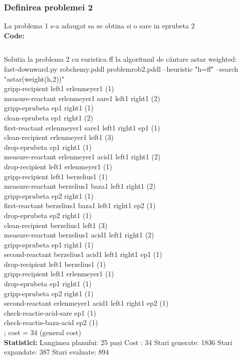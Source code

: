 \subsubsection{Definirea problemei 2}
   La problema 1 s-a adaugat sa se obtina si o sare in eprubeta 2\\\newline
\textbf{Code:}
\inputminted[linenos]{python}{code/ClassicPDDL/problemrob2.pddl}
Solutia la problema 2 cu euristica ff la algoritmul de căutare astar weighted: \\
fast-downward.py robchemy.pddl problemrob2.pddl --heuristic "h=ff" --search "astar(weight(h,2))" \\
gripp-recipient left1 erlenmeyer1 (1)\\
measure-reactant erlenmeyer1 sare1 left1 right1 (2)\\
gripp-eprubeta ep1 right1 (1)\\
clean-eprubeta ep1 right1 (2)\\
first-reactant erlenmeyer1 sare1 left1 right1 ep1 (1)\\
clean-recipient erlenmeyer1 left1 (3)\\
drop-eprubeta ep1 right1 (1)\\
measure-reactant erlenmeyer1 acid1 left1 right1 (2)\\
drop-recipient left1 erlenmeyer1 (1)\\
gripp-recipient left1 berzelius1 (1)\\
measure-reactant berzelius1 baza1 left1 right1 (2)\\
gripp-eprubeta ep2 right1 (1)\\
first-reactant berzelius1 baza1 left1 right1 ep2 (1)\\
drop-eprubeta ep2 right1 (1)\\
clean-recipient berzelius1 left1 (3)\\
measure-reactant berzelius1 acid1 left1 right1 (2)\\
gripp-eprubeta ep1 right1 (1)\\
second-reactant berzelius1 acid1 left1 right1 ep1 (1)\\
drop-recipient left1 berzelius1 (1)\\
gripp-recipient left1 erlenmeyer1 (1)\\
drop-eprubeta ep1 right1 (1)\\
gripp-eprubeta ep2 right1 (1)\\
second-reactant erlenmeyer1 acid1 left1 right1 ep2 (1)\\
check-reactie-acid-sare ep1 (1)\\
check-reactie-baza-acid ep2 (1)\\
; cost = 34 (general cost)\\
\textbf{Statistici: } 
Lungimea planului: 25 pași
Cost : 34
Stari generate: 1836
Stari expandate: 387
Stari evaluate: 894

